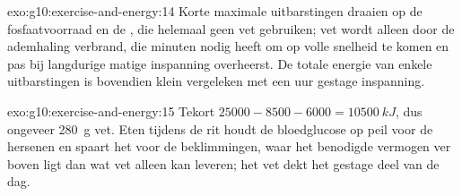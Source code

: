 \begin{solution}{exo:g10:exercise-and-energy:14}
Korte maximale uitbarstingen draaien op de fosfaatvoorraad en de
, die helemaal geen vet gebruiken; vet wordt alleen door de
ademhaling verbrand, die minuten nodig heeft om op volle snelheid te
komen en pas bij langdurige matige inspanning overheerst. De totale
energie van enkele uitbarstingen is bovendien klein vergeleken met een
uur gestage inspanning.
\end{solution}

\begin{solution}{exo:g10:exercise-and-energy:15}
Tekort $25000 - 8500 - 6000 = \qty{10500}{kJ}$, dus ongeveer
\qty{280}{g} vet. Eten tijdens de rit houdt de bloedglucose op peil voor
de hersenen en spaart het  voor de beklimmingen, waar het
benodigde vermogen ver boven ligt dan wat vet alleen kan leveren; het vet
dekt het gestage deel van de dag.
\end{solution}

